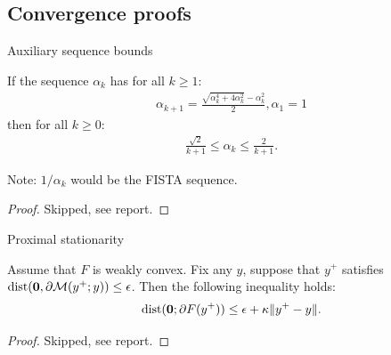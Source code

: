 \documentclass[11pt]{beamer}
\begin{document}
    \subsection{Convergence proofs}
        \begin{frame}{Auxiliary sequence bounds}
            \begin{lemma}
                If the sequence $\alpha_k$ has for all $k\ge 1$: 
                \begin{align*}
                    \alpha_{k + 1} = \frac{\sqrt{\alpha_k^4 + 4\alpha_k^2} - \alpha_k^2}{2}, \alpha_1 = 1
                \end{align*}
                then for all $k \ge0$: 
                \begin{align*}
                    \frac{\sqrt{2}}{k + 1} \le \alpha_k \le \frac{2}{k + 1}. 
                \end{align*}    
            \end{lemma}
            Note: $1/\alpha_k$ would be the FISTA sequence. 
            \begin{proof}
                Skipped,  see report. 
            \end{proof}
        \end{frame}
        \begin{frame}{Proximal stationarity}
            \begin{lemma}[Lemma B.2]
                Assume that $F$ is weakly convex. 
                Fix any $y$, suppose that $y^+$ satisfies $\operatorname{dist}(\mathbf 0,\partial \mathcal M(y^+; y)) \le \epsilon$. Then the following inequality holds: 
                \begin{align*}
                    \operatorname{dist}(\mathbf 0; \partial F(y^+)) 
                    \le \epsilon + \kappa\Vert y^+ - y\Vert. 
                \end{align*}    
            \end{lemma}
            \begin{proof}
                Skipped, see report. 
            \end{proof}
        \end{frame}
\end{document}
